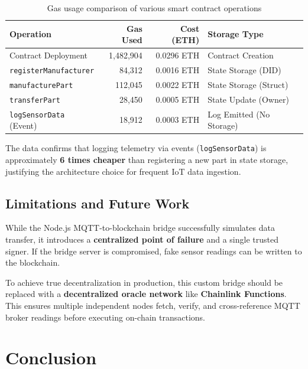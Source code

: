 \documentclass[12pt,a4paper]{article}
\begin{document}
\begin{table}[H]
\centering
\begin{tabularx}{\textwidth}{lrrX}
\toprule
\textbf{Operation} & \textbf{Gas Used} & \textbf{Cost (ETH)} & \textbf{Storage Type} \\
\midrule
Contract Deployment & 1,482,904 & 0.0296 ETH & Contract Creation \\
\texttt{registerManufacturer} & 84,312 & 0.0016 ETH & State Storage (DID) \\
\texttt{manufacturePart} & 112,045 & 0.0022 ETH & State Storage (Struct) \\
\texttt{transferPart} & 28,450 & 0.0005 ETH & State Update (Owner) \\
\texttt{logSensorData} (Event) & 18,912 & 0.0003 ETH & Log Emitted (No Storage) \\
\bottomrule
\end{tabularx}
\caption{Gas usage comparison of various smart contract operations}
\label{tab:gas-analysis}
\end{table}

The data confirms that logging telemetry via events (\texttt{logSensorData}) is approximately \textbf{6 times cheaper} than registering a new part in state storage, justifying the architecture choice for frequent IoT data ingestion.

\subsection{Limitations and Future Work}

While the Node.js MQTT-to-blockchain bridge successfully simulates data transfer, it introduces a \textbf{centralized point of failure} and a single trusted signer. If the bridge server is compromised, fake sensor readings can be written to the blockchain. 

To achieve true decentralization in production, this custom bridge should be replaced with a \textbf{decentralized oracle network} like \textbf{Chainlink Functions}. This ensures multiple independent nodes fetch, verify, and cross-reference MQTT broker readings before executing on-chain transactions.

\section{Conclusion}
\end{document}
